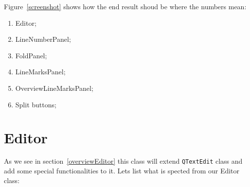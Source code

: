 \documentclass[11pt,a4paper]{report}
\begin{document}
Figure~\ref{screenshot} shows how the end result shoud be where the numbers mean:

\begin{enumerate}
\item Editor;
\item LineNumberPanel;
\item FoldPanel;
\item LineMarksPanel;
\item OverviewLineMarksPanel;
\item Split buttons;
\end{enumerate}

\section{Editor}
As we see in section~\ref{overviewEditor} this class will extend \texttt{QTextEdit} class and add some special functionalities to it. Lets list what is spected from our Editor class:
\end{document}

